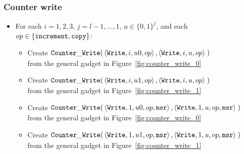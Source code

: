 \subsubsection{ Counter write }

\begin{itemize}

    \item For each $i = 1,2,3$,
                   $j = l-1,\ldots,1$,
                   $u \in \{0, 1\}^j$, and each
                   $op \in \{{\tt increment}, {\tt copy} \}$:
        \begin{itemize}
        \item Create
        $\begin{aligned}[t]
            {\tt Counter\_Write}(& \left\langle {\tt Write}, i, u0, op \right\rangle,
                       \left\langle {\tt Write}, i, u,  op \right\rangle \;)
        \end{aligned}$ \\ from the general gadget in Figure~\ref{fig:counter_write_0}

        \item Create
        $\begin{aligned}[t]
            {\tt Counter\_Write}(& \left\langle {\tt Write}, i,  u1, op \right\rangle,
                      \left\langle {\tt Write}, i,  u,  op \right\rangle \;)
        \end{aligned}$ \\ from the general gadget in Figure~\ref{fig:counter_write_1}


        \item Create
        $\begin{aligned}[t]
            {\tt Counter\_Write}(& \left\langle {\tt Write}, 1, u0, op, {\tt msr} \right\rangle,
                      \left\langle {\tt Write}, 1, u,  op, {\tt msr} \right\rangle \;)
        \end{aligned}$ \\ from the general gadget in Figure~\ref{fig:counter_write_0}

        \item Create
        $\begin{aligned}[t]
            {\tt Counter\_Write}(& \left\langle {\tt Write}, 1,  u1, op, {\tt msr} \right\rangle,
                      \left\langle {\tt Write}, 1,  u,  op, {\tt msr} \right\rangle \;)
        \end{aligned}$ \\ from the general gadget in Figure~\ref{fig:counter_write_1}


\end{itemize}
\end{itemize}

